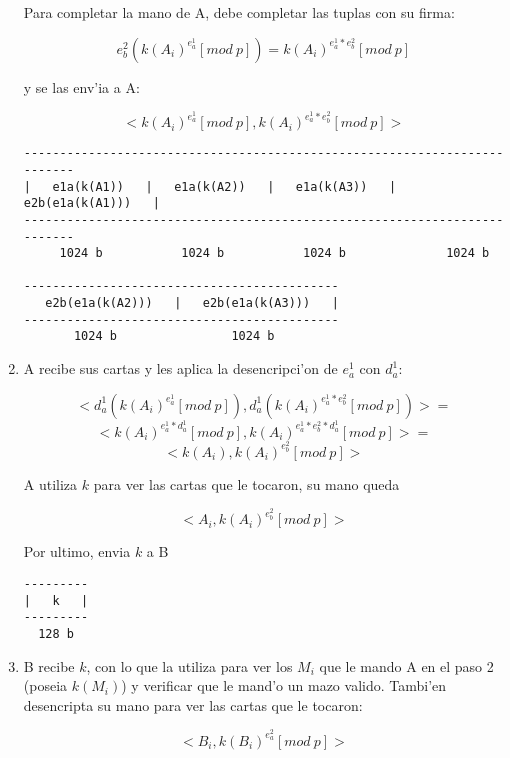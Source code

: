 \begin{enumerate}
Para completar la mano de A, debe completar las tuplas con su firma:

$$	e^2_b(k(A_i)^{e^1_a} [mod\ p]) =
	k(A_i)^{e^1_a * e^2_b} [mod\ p] $$
	
y se las env'ia a A:

$$	<k(A_i)^{e^1_a} [mod\ p],			k(A_i)^{e^1_a * e^2_b} [mod\ p]> $$
	

\begin{verbatim}
--------------------------------------------------------------------------
|   e1a(k(A1))   |   e1a(k(A2))   |   e1a(k(A3))   |   e2b(e1a(k(A1)))   |
--------------------------------------------------------------------------
     1024 b           1024 b           1024 b              1024 b         

--------------------------------------------
   e2b(e1a(k(A2)))   |   e2b(e1a(k(A3)))   |
--------------------------------------------
       1024 b                1024 b         
\end{verbatim}
	
	
	
	
	
\item A recibe sus cartas y les aplica la desencripci'on de $e^1_a$ con $d^1_a$:

$$	<d^1_a(k(A_i)^{e^1_a} [mod\ p]),			d^1_a(k(A_i)^{e^1_a * e^2_b} [mod\ p])> = $$
$$	<k(A_i)^{e^1_a * d^1_a} [mod\ p],			k(A_i)^{e^1_a * e^2_b * d^1_a} [mod\ p]> = $$
$$	<k(A_i),								k(A_i)^{e^2_b} [mod\ p]> $$
	
A utiliza $k$ para ver las cartas que le tocaron, su mano queda

$$	<A_i, k(A_i)^{e^2_b} [mod\ p]> $$

Por ultimo, envia $k$ a B


\begin{verbatim}
---------
|   k   |
---------
  128 b
\end{verbatim}

	 
	 
	 


\item B recibe $k$, con lo que la utiliza para ver los $M_i$ que le mando A en el paso 2 (poseia $k(M_i)$) y verificar que le mand'o un mazo valido. Tambi'en desencripta su mano para ver las cartas que le tocaron:

$$	<B_i, k(B_i)^{e^2_a} [mod\ p]> $$
	
\end{enumerate}	




